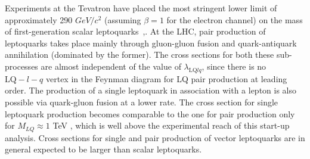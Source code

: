 %

Experiments at the Tevatron have placed the most stringent lower 
limit of approximately 290 $GeV/c^2$ (assuming $\beta=1$ for the electron channel) 
on the mass of first-generation scalar leptoquarks~\cite{d02008},\cite{Acosta:2005ge}.
At the LHC, pair production of leptoquarks takes place 
mainly through gluon-gluon fusion and 
quark-antiquark annihilation (dominated by the former). 
The cross sections for both these sub-processes are almost 
independent of the value of 
$\lambda_{\mbox{LQ}lq}$, since there is 
no $\mbox{LQ}-l-q$ vertex in the Feynman diagram for LQ pair production 
at leading order. 
The production of a single leptoquark in association with a lepton 
is also possible via quark-gluon 
fusion at a lower rate. 
The cross section for single leptoquark production
becomes comparable to the one for pair production only 
for $M_{LQ}\approx 1$ TeV \cite{Belyaev:2005ew}, 
which is well above the experimental reach of this start-up analysis.  
Cross sections for single and pair production of vector leptoquarks 
are in general expected to be larger than scalar leptoquarks.

%

